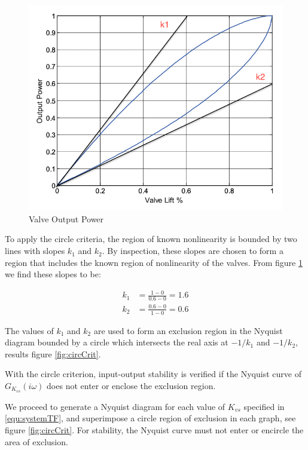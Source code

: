 \documentclass[a4paper, titlepage]{article}
\begin{document}
\begin{figure}[h!]
\center
\includegraphics[scale=0.25]{../figures/valveOutputPower.png}
\caption{Valve Output Power}
\label{fig:valvepower}
\end{figure}

To apply the circle criteria, the region of known nonlinearity is bounded by two lines with slopes $k_{1}$ and $k_{2}$.  By inspection, these slopes are chosen to form a region that includes the known region of nonlinearity of the valves.  From figure \ref{fig:valvepower} we find these slopes to be:

\begin{equation}
\begin{split}
k_{1} &= \frac{1-0}{0.6-0} = 1.6 \\
k_{2} &= \frac{0.6-0}{1-0} = 0.6
\end{split}
\label{equ:k_values}
\end{equation}

The values of $k_{1}$ and $k_{2}$ are used to form an exclusion region in the Nyquist diagram bounded by a circle which intersects the real axis at $-1/k_{1}$ and $-1/k_{2}$, results figure \ref{fig:circCrit}.

With the circle criterion, input-output stability is verified if the Nyquist curve of $G_{K_{vs}}(i\omega)$ does not enter or enclose the exclusion region.

We proceed to generate a Nyquist diagram for each value of $K_{vs}$ specified in \ref{equ:systemTF}, and superimpose a circle region of exclusion in each graph, see figure \ref{fig:circCrit}.
For stability, the Nyquist curve must not enter or encircle the area of exclusion.
\end{document}
